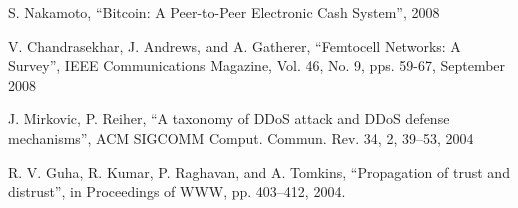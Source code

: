 \documentclass[12pt]{report}
\begin{document}
\begin{thebibliography}{9}
  S. Nakamoto,
  ``Bitcoin: A Peer-to-Peer Electronic Cash System'',
  2008
  
  V. Chandrasekhar, J. Andrews, and A. Gatherer,
  ``Femtocell Networks: A Survey'',
  IEEE Communications Magazine, Vol. 46, No. 9, pps. 59-67,
  September 2008
  
  J. Mirkovic, P. Reiher,
  ``A taxonomy of DDoS attack and DDoS defense mechanisms'',
  ACM SIGCOMM Comput. Commun. Rev. 34, 2, 39–53,
  2004

  R. V. Guha, R. Kumar, P. Raghavan, and A. Tomkins,
  ``Propagation of trust and distrust'',
  in Proceedings of WWW, pp. 403–412,
  2004.

\end{thebibliography}
\end{document}
